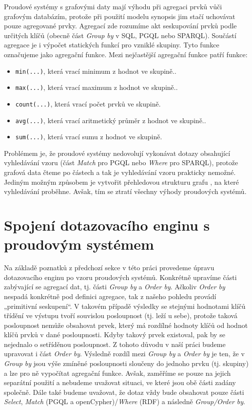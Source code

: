 Proudové systémy s grafovými daty mají výhodu při agregaci prvků vůči grafovým databázím, protože při použití modelu synopsis jim stačí uchovávat pouze agregované prvky. 
Agregací zde rozumíme akt seskupování prvků podle určitých klíčů (obecně část \textit{Group by} v SQL, PGQL nebo SPARQL).
Součástí agregace je i výpočet statických funkcí pro vzniklé skupiny.
Tyto funkce označujeme jako agregační funkce.
Mezi nejčastější agregační funkce patří funkce:
\begin{itemize} 
\item \texttt{min(...)}, která vrací minimum z hodnot ve skupině..
\item \texttt{max(...)}, která vrací maximum z hodnot ve skupině..
\item \texttt{count(...)}, která vrací počet prvků ve skupině.
\item \texttt{avg(...)}, která vrací aritmetický průměr z hodnot ve skupině..
\item \texttt{sum(...)}, která vrací sumu z hodnot ve skupině.
\end{itemize}
Problémem je, že proudové systémy nedovolují vykonávat dotazy obsahující vyhledávání vzoru (část \textit{Match} pro PGQL nebo \textit{Where} pro SPARQL), protože grafová data čteme po částech a tak je vyhledávání vzoru prakticky nemožné.
Jediným možným způsobem je vytvořit přehledovou strukturu grafu \citep{graphsummary}, na které vyhledávání proběhne.
Avšak, tím se ztratí všechny výhody proudových systémů.

\section*{Spojení dotazovacího enginu s proudovým systémem}

Na základě poznatků z předchozí sekce v této práci provedeme úpravu dotazovacího enginu po vzoru proudových systémů.
Konkrétně upravíme části zabývající se agregací dat, tj. části \textit{Group by} a \textit{Order by}.
Ačkoliv \textit{Order by} nespadá konkrétně pod definici agregace, tak z našeho pohledu provádí „primitivní seskupení“.
V takovém případě výsledky se stejnými hodnotami klíčů třídění ve výstupu tvoří souvislou posloupnost (tj. leží u sebe), protože taková posloupnost nemůže obsahovat prvek, který má rozdílné hodnoty klíčů od hodnot klíčů prvků v dané posloupnosti.
Kdyby takový prvek existoval, pak by se nejednalo o setříděnou posloupnost.   
Z tohoto důvodu v naší práci budeme upravovat i část \textit{Order by}.
Výsledně rozdíl mezi \textit{Group by} a \textit{Order by} je ten, že v \textit{Group by} jsou výše zmíněné posloupnosti sloučeny do jednoho prvku (tj. skupiny) a lze pro ně vypočítat agregační funkce. 
Avšak, zaměříme se pouze na jejich separátní použití a nebudeme uvažovat situaci, ve které jsou obě části zadány společně.
Dále také budeme uvažovat, že dotaz vždy bude obsahovat pouze části \textit{Select}, \textit{Match} (PGQL a openCypher)/\textit{Where} (RDF) a následně \textit{Group/Order by}.

